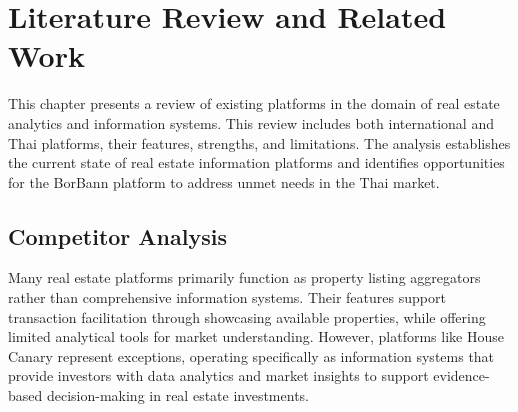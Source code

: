 \newcommand{\package}[1]{\textbf{#1}} %
\newcommand{\cmmd}[1]{\textbackslash\texttt{#1}} %


\chapter{Literature Review and Related Work}


This chapter presents a review of existing platforms in the domain of real estate analytics and information systems. 
This review includes both international and Thai platforms, their features, strengths, and limitations. 
The analysis establishes the current state of real estate information platforms and identifies opportunities 
for the BorBann platform to address unmet needs in the Thai market.

\section{Competitor Analysis}

Many real estate platforms primarily function as property listing aggregators rather than comprehensive information systems. 
Their features support transaction facilitation through showcasing available properties, while offering limited analytical tools for market understanding.
 However, platforms like House Canary represent exceptions, operating specifically as information systems that provide investors with
  data analytics and market insights to support evidence-based decision-making in real estate investments.

